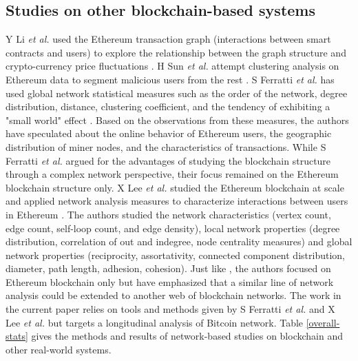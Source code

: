 \documentclass[preprint,12pt]{elsarticle}
\begin{document}
\subsection{Studies on other blockchain-based systems}
Y Li \textit{et al.} used the Ethereum transaction graph (interactions between smart contracts and users) to explore the relationship between the graph structure and crypto-currency price fluctuations \cite{li2019dissecting}. H Sun \textit{et al.} attempt clustering analysis on Ethereum data to segment malicious users from the rest \cite{sun2019ethereum}. S Ferratti \textit{et al.} has used global network statistical measures such as the order of the network, degree distribution, distance, clustering coefficient, and the tendency of exhibiting a "small world" effect \cite{ferretti2019ethereum}. Based on the observations from these measures, the authors have speculated about the online behavior of Ethereum users, the geographic distribution of miner nodes, and the characteristics of transactions. While S Ferratti \textit{et al.} argued for the advantages of studying the blockchain structure through a complex network perspective, their focus remained on the Ethereum blockchain structure only. X Lee \textit{et al.} studied the Ethereum blockchain at scale and applied network analysis measures to characterize interactions between users in Ethereum \cite{lee2019measurements}. The authors studied the network characteristics (vertex count, edge count, self-loop count, and edge density), local network properties (degree distribution, correlation of out and indegree, node centrality measures) and global network properties (reciprocity, assortativity, connected component distribution, diameter, path length, adhesion, cohesion). Just like \cite{ferretti2019ethereum}, the authors focused on Ethereum blockchain only but have emphasized that a similar line of network analysis could be extended to another web of blockchain networks. The work in the current paper relies on tools and methods given by S Ferratti \textit{et al.} \cite{ferretti2019ethereum} and X Lee \textit{et al.} \cite{lee2019measurements} but targets a longitudinal analysis of Bitcoin network. Table \ref{overall-stats} gives the methods and results of network-based studies on blockchain and other real-world systems.
\end{document}
